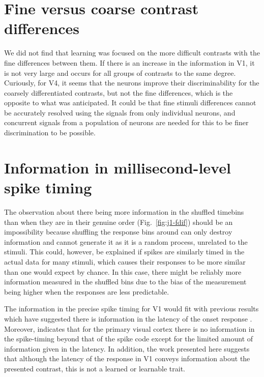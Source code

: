 \section{Fine versus coarse contrast differences}

We did not find that learning was focused on the more difficult contrasts with the fine differences between them. If there is an increase in the information in V1, it is not very large and occurs for all groups of contrasts to the same degree. Curiously, for V4, it seems that the neurons improve their discriminability for the coarsely differentiated contrasts, but not the fine differences, which is the opposite to what was anticipated. It could be that fine stimuli differences cannot be accurately resolved using the signals from only individual neurons, and concurrent signals from a population of neurons are needed for this to be finer discrimination to be possible.

\section{Information in millisecond-level spike timing}

The observation about there being more information in the shuffled timebins than when they are in their genuine order (Fig.~\ref{fig:j1-fdif}) should be an impossibility because shuffling the response bins around can only destroy information and cannot generate it as it is a random process, unrelated to the stimuli.
This could, however, be explained if spikes are similarly timed in the actual data for many stimuli, which causes their responses to be more similar than one would expect by chance. In this case, there might be reliably more information measured in the shuffled bins due to the bias of the measurement being higher when the responses are less predictable.

The information in the precise spike timing for V1 would fit with previous results which have suggested there is information in the latency of the onset response
\cite{Reich2001,Tovee1993,Rolls2011}.
Moreover, \cite{Tovee1993,Rolls2011} indicates that for the primary visual cortex there is no information in the spike-timing beyond that of the spike code except for the limited amount of information given in the latency.
In addition, the work presented here suggests that although the latency of the response in V1 conveys information about the presented contrast, this is not a learned or learnable trait.


